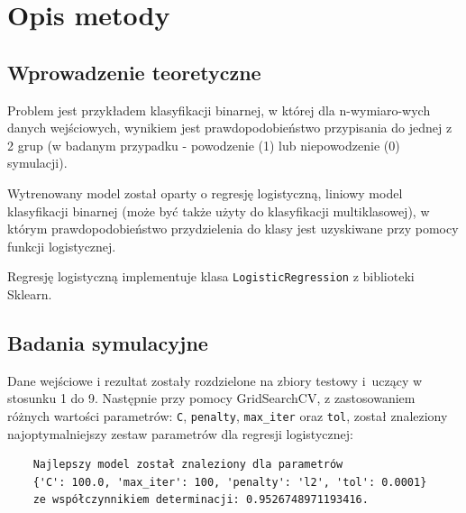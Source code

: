 \documentclass[11pt, a4paper, notitlepage]{report}
\begin{document}
\chapter{Opis metody}
\section{Wprowadzenie teoretyczne}
Problem jest przykładem klasyfikacji binarnej, w której dla n-wymiaro-wych danych wejściowych, wynikiem jest prawdopodobieństwo przypisania do jednej z 2 grup (w badanym przypadku - powodzenie (1) lub niepowodzenie (0) symulacji).\par
Wytrenowany model został oparty o regresję logistyczną, liniowy model klasyfikacji binarnej (może być także użyty do klasyfikacji multiklasowej), w którym prawdopodobieństwo przydzielenia do klasy jest uzyskiwane przy pomocy funkcji logistycznej.\par
Regresję logistyczną implementuje klasa \verb|LogisticRegression| z biblioteki Sklearn.

\section{Badania symulacyjne}
Dane wejściowe i rezultat zostały rozdzielone na zbiory testowy i~uczący w stosunku 1 do 9. Następnie przy pomocy GridSearchCV, z zastosowaniem różnych wartości parametrów: \verb|C|, \verb|penalty|, \verb|max_iter| oraz \verb|tol|, został znaleziony najoptymalniejszy zestaw parametrów dla regresji logistycznej:\par
\begin{verbatim}
	Najlepszy model został znaleziony dla parametrów 
	{'C': 100.0, 'max_iter': 100, 'penalty': 'l2', 'tol': 0.0001} 
	ze współczynnikiem determinacji: 0.9526748971193416.
\end{verbatim} \par
\end{document}
